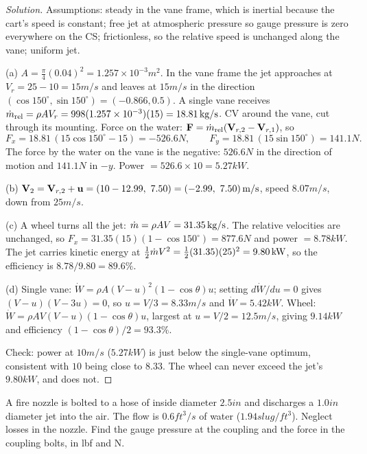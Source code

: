 \begin{proof}[Solution]
Assumptions: steady in the vane frame, which is inertial because the cart's speed is constant; free jet at atmospheric pressure so gauge pressure is zero everywhere on the CS; frictionless, so the relative speed is unchanged along the vane; uniform jet.

(a) $A = \tfrac{\pi}{4}(0.04)^2 = 1.257\times10^{-3}\unit{m^2}$. In the vane frame the jet approaches at $V_r = 25 - 10 = 15\unit{m/s}$ and leaves at $15\unit{m/s}$ in the direction $(\cos150^\circ, \sin150^\circ) = (-0.866, 0.5)$. A single vane receives $\dot m_\text{rel} = \rho AV_r = 998(1.257\times10^{-3})(15) = 18.81\,\mathrm{kg/s}$. CV around the vane, cut through its mounting. Force on the water: $\mathbf{F} = \dot m_\text{rel}(\mathbf{V}_{r,2} - \mathbf{V}_{r,1})$, so
\[
F_x = 18.81\,(15\cos150^\circ - 15) = -526.6\unit{N},\qquad F_y = 18.81\,(15\sin150^\circ) = 141.1\unit{N}.
\]
The force by the water on the vane is the negative: $526.6\unit{N}$ in the direction of motion and $141.1\unit{N}$ in $-y$. Power $= 526.6\times10 = 5.27\unit{kW}$.

(b) $\mathbf{V}_2 = \mathbf{V}_{r,2} + \mathbf{u} = (10 - 12.99,\ 7.50) = (-2.99,\ 7.50)\,\mathrm{m/s}$, speed $8.07\unit{m/s}$, down from $25\unit{m/s}$.

(c) A wheel turns all the jet: $\dot m = \rho AV = 31.35\,\mathrm{kg/s}$. The relative velocities are unchanged, so $F_x = 31.35(15)(1 - \cos150^\circ) = 877.6\unit{N}$ and power $= 8.78\unit{kW}$. The jet carries kinetic energy at $\tfrac12\dot m V^2 = \tfrac12(31.35)(25)^2 = 9.80\,\mathrm{kW}$, so the efficiency is $8.78/9.80 = 89.6\%$.

(d) Single vane: $\dot W = \rho A(V - u)^2(1 - \cos\theta)u$; setting $d\dot W/du = 0$ gives $(V - u)(V - 3u) = 0$, so $u = V/3 = 8.33\unit{m/s}$ and $\dot W = 5.42\unit{kW}$. Wheel: $\dot W = \rho AV(V - u)(1 - \cos\theta)u$, largest at $u = V/2 = 12.5\unit{m/s}$, giving $9.14\unit{kW}$ and efficiency $(1 - \cos\theta)/2 = 93.3\%$.

Check: power at $10\unit{m/s}$ ($5.27\unit{kW}$) is just below the single-vane optimum, consistent with $10$ being close to $8.33$. The wheel can never exceed the jet's $9.80\unit{kW}$, and does not.
\end{proof}

\begin{example}
A fire nozzle is bolted to a hose of inside diameter $2.5\unit{in}$ and discharges a $1.0\unit{in}$ diameter jet into the air. The flow is $0.6\unit{ft^3/s}$ of water ($1.94\unit{slug/ft^3}$). Neglect losses in the nozzle. Find the gauge pressure at the coupling and the force in the coupling bolts, in lbf and N.
\end{example}

